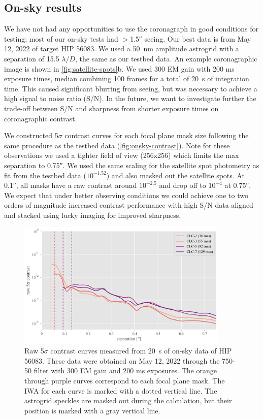 \documentclass[]{spie}  %
\begin{document}
\subsection{On-sky results}\label{sec:onsky}

We have not had any opportunities to use the coronagraph in good conditions for testing; most of our on-sky tests had $>$\ang{;;1.5} seeing. Our best data is from May 12, 2022 of target HIP 56083. We used a \qty{50}{\nano\meter} amplitude astrogrid with a separation of 15.5 $\lambda/D$, the same as our testbed data. An example coronagraphic image is shown in \autoref{fig:satellite-spots}b. We used 300 EM gain with 200 ms exposure times, median combining 100 frames for a total of \qty{20}{\second} of integration time. This caused significant blurring from seeing, but was necessary to achieve a high signal to noise ratio (S/N). In the future, we want to investigate further the trade-off between S/N and sharpness from shorter exposure times on coronagraphic contrast.

We constructed 5$\sigma$ contrast curves for each focal plane mask size following the same procedure as the testbed data (\autoref{fig:onsky-contrast}). Note for these observations we used a tighter field of view (256x256) which limits the max separation to \ang{;;0.75}. We used the same scaling for the satellite spot photometry as fit from the testbed data ($10^{-1.52}$) and also masked out the satellite spots. At \ang{;;0.1}, all masks have a raw contrast around $10^{-2.5}$ and drop off to $10^{-4}$ at \ang{;;0.75}. We expect that under better observing conditions we could achieve one to two orders of magnitude increased contrast performance with high S/N data aligned and stacked using lucky imaging for improved sharpness.

\begin{figure}
   \centering
   \includegraphics[width=0.9\textwidth]{figures/HIP56083_20220512_curves}
   \caption{Raw 5$\sigma$ contrast curves measured from \qty{20}{\second} of on-sky data of HIP 56083. These data were obtained on May 12, 2022 through the 750-50 filter with 300 EM gain and 200 ms exposures. The orange through purple curves correspond to each focal plane mask. The IWA for each curve is marked with a dotted vertical line. The astrogrid speckles are masked out during the calculation, but their position is marked with a gray vertical line.}\label{fig:onsky-contrast}
\end{figure}
\end{document}
